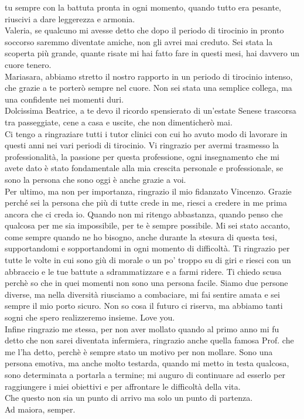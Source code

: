 tu sempre con la battuta pronta in ogni momento, quando tutto era pesante, riuscivi a dare leggerezza e armonia.\\
Valeria, se qualcuno mi avesse detto che dopo il periodo di tirocinio in pronto soccorso saremmo diventate amiche, 
non gli avrei mai creduto. Sei stata la scoperta più grande, quante risate mi hai fatto fare in questi mesi, 
hai davvero un cuore tenero.\\
Mariasara, abbiamo stretto il nostro rapporto in un periodo di tirocinio intenso, che grazie a te porterò sempre 
nel cuore. Non sei stata una semplice collega, ma una confidente nei momenti duri.\\
Dolcissima Beatrice, a te devo il ricordo spensierato di un'estate Senese trascorsa tra passeggiate, cene a casa e 
uscite, che non dimenticherò mai.\\
Ci tengo a ringraziare tutti i tutor clinici con cui ho avuto modo di lavorare in questi anni nei vari periodi di 
tirocinio. Vi ringrazio per avermi trasmesso la professionalità, la passione per questa professione, ogni insegnamento 
che mi avete dato è stato fondamentale alla mia crescita personale e professionale, se sono la persona che sono 
oggi è anche grazie a voi.\\
Per ultimo, ma non per importanza, ringrazio il mio fidanzato Vincenzo. 
Grazie perché sei la persona che più di tutte crede in me, riesci a credere in me prima ancora che ci 
creda io. Quando non mi ritengo abbastanza, quando penso che qualcosa per me sia impossibile, per te è sempre possibile. 
Mi sei stato accanto, come sempre quando ne ho bisogno, anche durante la stesura di questa tesi, supportandomi e sopportandomi 
in ogni momento di difficoltà. Ti ringrazio per tutte le volte in cui sono giù di 
morale o un po' troppo su di giri e riesci con un abbraccio e le tue battute a sdrammatizzare 
e a farmi ridere. Ti chiedo scusa perchè so che in quei momenti non sono una persona facile.
Siamo due persone diverse, ma nella diversità riusciamo a combaciare, mi fai sentire amata e sei sempre il mio porto sicuro. 
Non so cosa il futuro ci riserva, ma abbiamo tanti sogni che spero realizzeremo insieme. 
Love you.\\
Infine ringrazio me stessa, per non aver mollato quando al primo anno mi fu detto che non sarei diventata infermiera, 
ringrazio anche quella famosa Prof. che me l’ha detto, perchè è sempre stato un motivo per non mollare. 
Sono una persona emotiva, ma anche molto testarda, quando mi metto in testa qualcosa, sono determinata a portarla a termine; 
mi auguro di continuare ad esserlo per raggiungere i miei obiettivi e per affrontare le difficoltà della vita.\\ 
Che questo non sia un punto di arrivo ma solo un punto di partenza.\\ 
Ad maiora, semper. 


